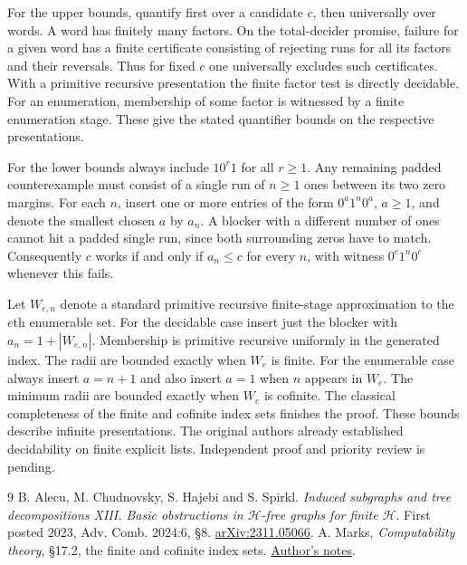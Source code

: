 \documentclass[10pt]{article}
\begin{document}
For the upper bounds, quantify first over a candidate $c$, then universally over words. A word has finitely many factors. On the total-decider promise, failure for a given word has a finite certificate consisting of rejecting runs for all its factors and their reversals. Thus for fixed $c$ one universally excludes such certificates. With a primitive recursive presentation the finite factor test is directly decidable. For an enumeration, membership of some factor is witnessed by a finite enumeration stage. These give the stated quantifier bounds on the respective presentations.

For the lower bounds always include $10^r1$ for all $r\ge1$. Any remaining padded counterexample must consist of a single run of $n\ge1$ ones between its two zero margins. For each $n$, insert one or more entries of the form $0^a1^n0^a$, $a\ge1$, and denote the smallest chosen $a$ by $a_n$. A blocker with a different number of ones cannot hit a padded single run, since both surrounding zeros have to match. Consequently $c$ works if and only if $a_n\le c$ for every $n$, with witness $0^c1^n0^c$ whenever this fails.

Let $W_{e,n}$ denote a standard primitive recursive finite-stage approximation to the $e$th enumerable set. For the decidable case insert just the blocker with $a_n=1+|W_{e,n}|$. Membership is primitive recursive uniformly in the generated index. The radii are bounded exactly when $W_e$ is finite. For the enumerable case always insert $a=n+1$ and also insert $a=1$ when $n$ appears in $W_e$. The minimum radii are bounded exactly when $W_e$ is cofinite. The classical completeness of the finite and cofinite index sets \cite{marks} finishes the proof. These bounds describe infinite presentations. The original authors already established decidability on finite explicit lists. Independent proof and priority review is pending.
\begin{thebibliography}{9}
 B. Alecu, M. Chudnovsky, S. Hajebi and S. Spirkl. \emph{Induced subgraphs and tree decompositions XIII. Basic obstructions in $\mathcal H$-free graphs for finite $\mathcal H$}. First posted 2023, Adv. Comb. 2024:6, \S8. \href{https://arxiv.org/abs/2311.05066}{arXiv:2311.05066}.
 A. Marks, \emph{Computability theory}, \S17.2, the finite and cofinite index sets. \href{https://math.berkeley.edu/~marks/notes/computability_notes_v1.pdf}{Author's notes}.
\end{thebibliography}
\end{document}
